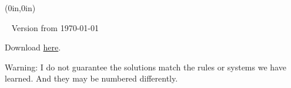 \documentclass[openany,oneside]{memoir}
\begin{document}
\thispagestyle{empty}
\begin{textblock*}{0in}(0in,0in)
  \noindent\hfill
  \begin{minipage}[b][\stockheight][s]{.9\stockwidth}
  \end{minipage}
  \hspace*{1cm}
\end{textblock*}
\
    \vfill
    \noindent Version from \today\par
    \noindent Download \href{https://github.com/catrincm/forallx-bris/raw/master/forallxbris.pdf}{here}. \par 
    \noindent Warning: I do not guarantee the solutions match the rules or systems we have learned. And they may be numbered differently. 
\newpage\color{black}





\midsloppy




\frontmatter


\tableofcontents*

\mainmatter









\end{document}
